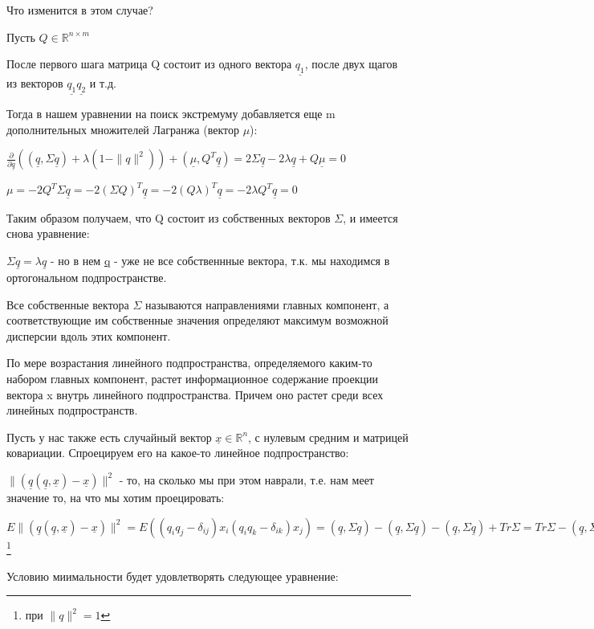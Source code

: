 \documentclass[a4paper, 12pt]{article}
\begin{document}
	Что изменится в этом случае? 
	
	Пусть $Q \in  \mathbb {R}^{n\times m}$
	
	После первого шага матрица Q состоит из одного вектора $\underline{q_1}$, после двух щагов из векторов $\underline{q_1}$$\underline{q_2}$ и т.д.
	
	Тогда в нашем уравнении на поиск экстремуму добавляется еще m дополнительных множителей Лагранжа (вектор $\mu$):
	
	$\frac{\partial }{\partial \underline{q}}((\underline{q}, \Sigma \underline{q}) + \lambda (1 - \|q\|^2)) + (\underline{\mu}, Q^T\underline{q}) = 2 \Sigma\underline{q} - 2 \lambda \underline{q} + Q\underline{\mu} = 0$
	
	$\mu = -2 Q^T\Sigma\underline{q} = -2(\Sigma Q)^T\underline{q} = -2(Q\lambda)^T\underline{q} = -2\lambda Q^T\underline{q} = 0$
	
	Таким образом получаем, что Q состоит из собственных векторов $\Sigma$, и имеется снова уравнение: 
	
	$\Sigma \underline{q} = \lambda \underline{q}$ - но в нем \underline{q} - уже не все собственнные вектора, т.к. мы находимся в ортогональном подпространстве.
	
	Все собственные вектора $\Sigma$ называются направлениями главных компонент, а соответствующие им собственные значения определяют максимум возможной дисперсии вдоль этих компонент.
	
	По мере возрастания линейного подпространства, определяемого каким-то набором главных компонент, растет информационное содержание проекции вектора x  внутрь линейного подпространства. Причем оно растет среди всех линейных подпространств. 
	
	Пусть у нас также есть случайный вектор $\underline{x} \in \mathbb {R}^n$, с нулевым средним и матрицей ковариации. Спроецируем его на какое-то линейное подпространство:
	
	$\|(\underline{q}(\underline{q},\underline{x}) - \underline{x})\|^2$ - то, на сколько мы при этом наврали, т.е. нам меет значение то, на что мы хотим проецировать:
	
	$E\|(\underline{q}(\underline{q},\underline{x}) - \underline{x})\|^2 = E((q_iq_j - \delta_{ij})x_i(q_iq_k - \delta_{ik})x_j) = (\underline{q}, \Sigma\underline{q}) - (\underline{q}, \Sigma\underline{q}) - (\underline{q}, \Sigma\underline{q}) + Tr \Sigma = Tr \Sigma - (\underline{q}, \Sigma\underline{q}) \rightarrow min$\footnote{при $\|q\|^2=1$}
	
	Условию миимальности будет удовлетворять следующее уравнение:
	
\end{document}
